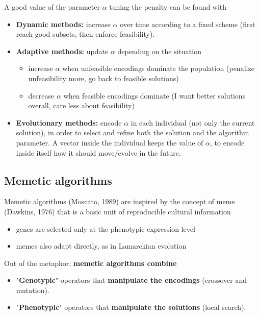 A good value of the parameter $\alpha$ tuning the penalty can be found with
\begin{itemize}
	\item \textbf{Dynamic methods:} increase $\alpha$ over time according to a fixed scheme (first reach good subsets, then enforce feasibility).\\
	
	\item \textbf{Adaptive methods:} update $\alpha$ depending on the situation
	\begin{itemize}
		\item increase $\alpha$ when unfeasible encodings dominate the population (penalize unfeasibility more, go back to feasible solutions)
		\item decrease $\alpha$ when feasible encodings dominate (I want better solutions overall, care less about feasibility)
	\end{itemize}
	\nn
	
	\item \textbf{Evolutionary methods:} encode $\alpha$ in each individual (not only the current solution), in order to select and refine both the solution and the algorithm parameter. A vector inside the individual keeps the value of $\alpha$, to encode inside itself how it should move/evolve in the future.\\
\end{itemize}

\newpage

\subsection{Memetic algorithms}

Memetic algorithms (Moscato, 1989) are inspired by the concept of meme (Dawkins, 1976) that is a basic unit of reproducible cultural information
\begin{itemize}
	\item genes are selected only at the phenotypic expression level
	\item memes also adapt directly, as in Lamarckian evolution
\end{itemize}

Out of the metaphor, \textbf{memetic algorithms combine}
\begin{itemize}
	\item "\textbf{Genotypic}" operators that \textbf{manipulate the encodings} (crossover and mutation).\\
	
	\item "\textbf{Phenotypic}" operators that \textbf{manipulate the solutions} (local search).\\
\end{itemize}

